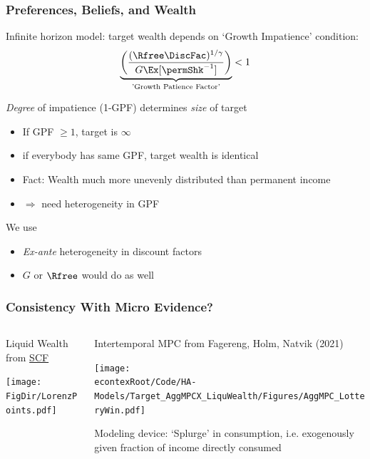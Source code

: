 \documentclass[pdflatex,aspectratio=169]{beamer}
\renewcommand{\PermGroFac}{G}
\begin{document}
\begin{frame}
  \frametitle{Preferences, Beliefs, and Wealth}
  Infinite horizon model: target wealth depends on `Growth Impatience' condition:
\begin{equation}
  \underbrace{
    \left(
      \frac{(\Rfree \DiscFac)^{1/\gamma}}
      {\PermGroFac\Ex[\permShk^{-1}]}
    \right)
    }_{\text{'Growth Patience Factor'}}
      < 1
    \end{equation}
    
  \pause 
  \emph{Degree} of impatience (1-GPF) determines \emph{size} of target
  \begin{itemize}[<+->]
  \item If GPF $\geq 1$, target is $\infty$
    \item if everybody has same GPF, target wealth is identical
    \item Fact: Wealth much more unevenly distributed than permanent income
      \item $\Rightarrow$ need heterogeneity in GPF
  \end{itemize}

  \hypertarget{ConsistentWithMicroData}{}

  \pause
  We use
  \begin{itemize}[<+->]
  \item \textit{Ex-ante} heterogeneity in discount factors
  \item $\PermGroFac$ or $\Rfree$ would do as well
  \end{itemize}
  
\end{frame}

\begin{frame}
  \frametitle{Consistency With Micro Evidence?}
  \begin{columns}
    \begin{column}{0.5\textwidth}
      Liquid Wealth from \href{https://www.federalreserve.gov/econres/scfindex.htm}{SCF}
      
      \texttt{[image: \\FigDir/LorenzPoints.pdf]}
      
    \end{column}
    
    \pause
    
    \begin{column}{0.4\textwidth}  	
      Intertemporal MPC from Fagereng, Holm, Natvik (2021)	
      
      \texttt{[image: \\econtexRoot/Code/HA-Models/Target\_AggMPCX\_LiquWealth/Figures/AggMPC\_LotteryWin.pdf]}
      
      Modeling device: `Splurge' in consumption, i.e. exogenously given fraction of income directly consumed
    \end{column}
  \end{columns}
  
\end{frame}
\end{document}
